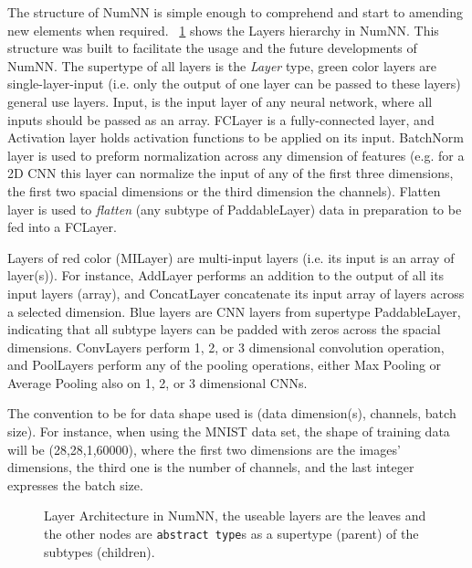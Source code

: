 The structure of NumNN is simple enough to comprehend and start to amending new elements when required. \figurename~\ref{fig:layerstruct} shows the Layers hierarchy in NumNN. This structure was built to facilitate the usage and the future developments of NumNN. The supertype of all layers is the \emph{Layer} type, green color layers are single-layer-input (i.e. only the output of one layer can be passed to these layers) general use layers. Input, is the input layer of any neural network, where all inputs should be passed as an array. FCLayer is a fully-connected layer, and Activation layer holds activation functions to be applied on its input. BatchNorm layer is used to preform normalization across any dimension of features (e.g. for a 2D CNN this layer can normalize the input of any of the first three dimensions, the first two spacial dimensions or the third dimension the channels). Flatten layer is used to \emph{flatten} (any subtype of PaddableLayer) data in preparation to be fed into a FCLayer.

Layers of red color (MILayer) are multi-input layers (i.e. its input is an array of layer(s)). For instance, AddLayer performs an addition to the output of all its input layers (array), and ConcatLayer concatenate its input array of layers across a selected dimension. Blue layers are CNN layers from supertype PaddableLayer, indicating that all subtype layers can be padded with zeros across the spacial dimensions. ConvLayers perform 1, 2, or 3 dimensional convolution operation, and PoolLayers perform any of the pooling operations, either Max Pooling or Average Pooling also on 1, 2, or 3 dimensional CNNs.

The convention to be for data shape used is (data dimension(s), channels, batch size). For instance, when using the MNIST \cite{LeCun1998,LeCun1998a} data set, the shape of training data will be (28,28,1,60000), where the first two dimensions are the images' dimensions, the third one is the number of channels, and the last integer expresses the batch size.

\begin{figure}[!htbp]
	\centering
		
	\caption{Layer Architecture in NumNN, the useable layers are the leaves and the other nodes are \texttt{abstract type}s as a supertype (parent) of the subtypes (children).}\label{fig:layerstruct}
\end{figure}

